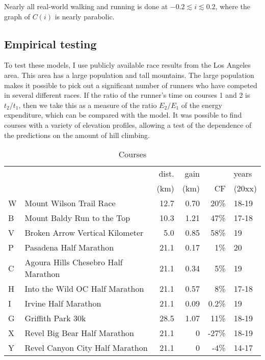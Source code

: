 \documentclass[10pt,letterpaper]{article}
\begin{document}
Nearly all real-world walking and running is
done at $-0.2 \lesssim i \lesssim 0.2$, where the graph of $C(i)$ is nearly parabolic.

\subsection*{Empirical testing}

To test these models, I use publicly available race results from the Los Angeles area.
This area has a large population and tall mountains. The large population makes it possible
to pick out a significant number of runners who have competed in several different races.
If the ratio of the runner's time on courses 1 and 2 is $t_2/t_1$, then we take this
as a measure of the ratio $E_2/E_1$ of the energy expenditure, which can be compared with
the model. It was possible to find courses with a variety of elevation profiles, allowing
a test of the dependence of the predictions on the amount of hill climbing.

\begin{table}[h]\label{table:courses}
\caption{Courses}
\begin{tabular}{lp{60mm}rrrl}
                 &       & dist.  & gain &  &  years \\
                 &       & (km)      &  (km) & CF & (20xx) \\
W & Mount Wilson Trail Race         & 12.7 & 0.70 & 20\%        & 18-19\\
B & Mount Baldy Run to the Top      & 10.3 & 1.21 & 47\%        & 17-18\\
V & Broken Arrow Vertical Kilometer & 5.0  & 0.85 & 58\%        & 19 \\
P & Pasadena Half Marathon          & 21.1 & 0.17 & 1\%         & 20 \\
C & Agoura Hills Chesebro Half Marathon & 21.1 & 0.34 & 5\%     & 19 \\
H & Into the Wild OC Half Marathon & 21.1 & 0.57 & 8\% & 17-18\\
I & Irvine Half Marathon           & 21.1 & 0.09 & 0.2\% & 19\\
G & Griffith Park 30k               & 28.5 & 1.07 & 11\%        & 18-19 \\
X & Revel Big Bear Half Marathon    & 21.1 & 0    & -27\% & 18-19 \\
Y & Revel Canyon City Half Marathon    & 21.1 & 0    & -4\% & 14-17
\end{tabular}
\label{table:courses}
\end{table}
\end{document}
